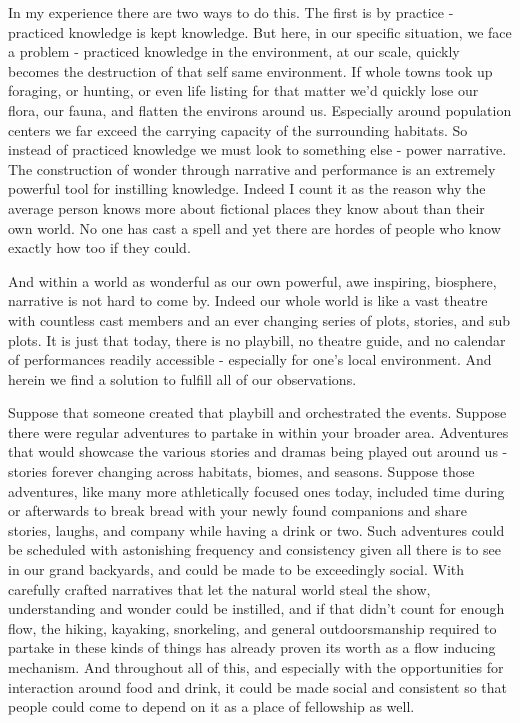 \documentclass[10pt,a5paper]{book}
\begin{document}
In my experience there are two ways to do this. The first is by practice - practiced knowledge is kept knowledge. But here, in our specific situation, we face a problem - practiced knowledge in the environment, at our scale, quickly becomes the destruction of that self same environment. If whole towns took up foraging, or hunting, or even life listing for that matter we'd quickly lose our flora, our fauna, and flatten the environs around us. Especially around population centers we far exceed the carrying capacity of the surrounding habitats. So instead of practiced knowledge we must look to something else - power narrative. The construction of wonder through narrative and performance is an extremely powerful tool for instilling knowledge. Indeed I count it as the reason why the average person knows more about fictional places they know about than their own world. No one has cast a spell and yet there are hordes of people who know exactly how too if they could. 

And within a world as wonderful as our own powerful, awe inspiring, biosphere, narrative is not hard to come by. Indeed our whole world is like a vast theatre with countless cast members and an ever changing series of plots, stories, and sub plots. It is just that today, there is no playbill, no theatre guide, and no calendar of performances readily accessible - especially for one's local environment. And herein we find a solution to fulfill all of our observations.

Suppose that someone created that playbill and orchestrated the events. Suppose there were regular adventures to partake in within your broader area. Adventures that would showcase the various stories and dramas being played out around us - stories forever changing across habitats, biomes, and seasons. Suppose those adventures, like many more athletically focused ones today, included time during or afterwards to break bread with your newly found companions and share stories, laughs, and company while having a drink or two. Such adventures could be scheduled with astonishing frequency and consistency given all there is to see in our grand backyards, and could be made to be exceedingly social. With carefully crafted narratives that let the natural world steal the show, understanding and wonder could be instilled, and if that didn't count for enough flow, the hiking, kayaking, snorkeling, and general outdoorsmanship required to partake in these kinds of things has already proven its worth as a flow inducing mechanism. And throughout all of this, and especially with the opportunities for interaction around food and drink, it could be made social and consistent so that people could come to depend on it as a place of fellowship as well. 
\end{document}
